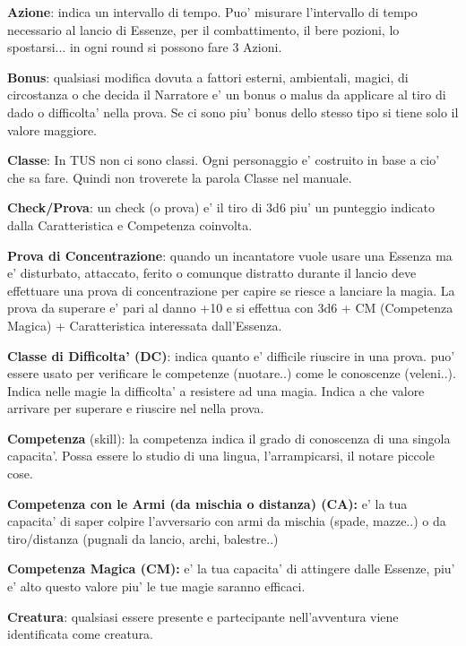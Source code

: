 \documentclass[a4paper,11pt,twoside,openany]{dndbook}
\begin{document}
\textbf{Azione}: indica un intervallo di tempo. Puo' misurare l'intervallo di tempo necessario al lancio di Essenze, per il combattimento, il bere pozioni, lo spostarsi... in ogni round si possono fare 3 Azioni.

\textbf{Bonus}: qualsiasi modifica dovuta a fattori esterni, ambientali, magici, di circostanza o che decida il Narratore e' un bonus o malus da applicare al tiro di dado o difficolta' nella prova. Se ci sono piu' bonus dello stesso tipo si tiene solo il valore maggiore.

\textbf{Classe}: In TUS non ci sono classi. Ogni personaggio e' costruito in base a cio' che sa fare. Quindi non troverete la parola Classe nel manuale.

\textbf{Check/Prova}: un check (o prova) e' il tiro di 3d6 piu' un punteggio indicato dalla Caratteristica e Competenza coinvolta.

\textbf{Prova di Concentrazione}: quando un incantatore vuole usare una Essenza ma e' disturbato, attaccato, ferito o comunque distratto durante il lancio deve effettuare una prova di concentrazione per capire se riesce a lanciare la magia. La prova da superare e' pari al danno +10 e si effettua con 3d6 + CM (Competenza Magica) + Caratteristica interessata dall'Essenza.

\textbf{Classe di Difficolta' (DC)}: indica quanto e' difficile riuscire in una prova. puo' essere usato per verificare le competenze (nuotare..) come le conoscenze (veleni..). Indica nelle magie la difficolta' a resistere ad una magia. Indica a che valore arrivare per superare e riuscire nel nella prova.

\textbf{Competenza} (skill): la competenza indica il grado di conoscenza di una singola capacita'. Possa essere lo studio di una lingua, l'arrampicarsi, il notare piccole cose.

\textbf{Competenza con le Armi (da mischia o distanza) (CA):} e' la tua capacita' di saper colpire l'avversario con armi da mischia (spade, mazze..) o da tiro/distanza (pugnali da lancio, archi, balestre..) 

\textbf{Competenza Magica (CM):} e' la tua capacita' di attingere dalle Essenze, piu' e' alto questo valore piu' le tue magie saranno efficaci.

\textbf{Creatura}: qualsiasi essere presente e partecipante nell'avventura viene identificata come creatura.
\end{document}
